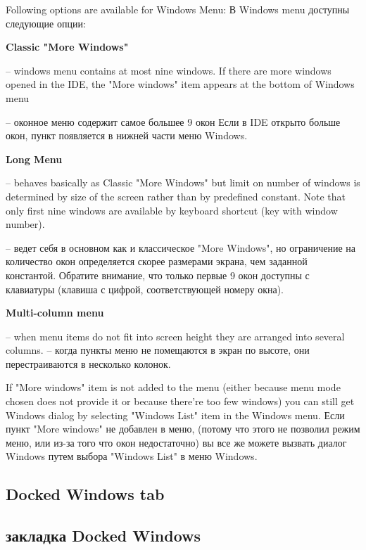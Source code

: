 \ifenglish
Following options are available for Windows Menu:
 \else
В Windows menu доступны следующие опции:
\fi
\begin{description}
\item{\bf Classic "More Windows"}

\ifenglish
-- windows menu contains at most nine windows.
If there are more windows opened in the IDE, the "More windows" item
appears at the bottom of Windows menu

 \else
-- оконное меню содержит самое большее 9 окон
Если в IDE открыто больше окон, пункт 
появляется в нижней части меню Windows.
 \fi
\item{\bf Long Menu}

\ifenglish
-- behaves basically as Classic "More Windows" but limit on number of windows
is determined by size of the screen rather than by predefined constant. Note that
only first nine windows are available by keyboard shortcut (key with window number).

 \else
-- ведет себя в основном как и классическое "More Windows", но ограничение на
количество окон определяется скорее размерами экрана, чем заданной константой.
Обратите внимание, что только первые 9 окон доступны с клавиатуры (клавиша с
цифрой, соответствующей номеру окна).
 \fi
\item{\bf Multi-column menu}

\ifenglish
-- when menu items do not fit into screen height they are arranged into several
columns.
 \else
-- когда пункты меню не помещаются в экран по высоте, они перестраиваются в 
несколько колонок.
 \fi
\end{description}

\ifenglish
If "More windows" item is not added to the menu (either because menu mode
 chosen does not provide it or because there're too few windows) you can still
get Windows dialog by selecting "Windows List" item in the Windows menu.
 \else
Если пункт "More windows" не добавлен в меню, (потому что этого не позволил 
режим меню, или из-за того что окон недостаточно) вы все же можете
вызвать диалог Windows путем выбора "Windows List" в меню Windows.
 \fi

\ifenglish
\subsection {Docked Windows tab}
 \else
\subsection {закладка Docked Windows}
 \fi
{}

